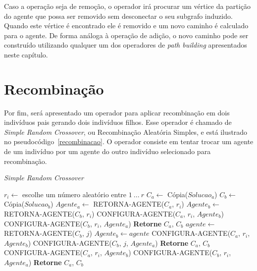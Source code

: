 Caso a operação seja de remoção, o operador irá procurar um vértice da partição 
do agente que possa ser removido sem desconectar o seu subgrafo induzido. Quando 
este vértice é encontrado ele é removido e um novo caminho é calculado para 
o agente. De forma análoga à operação de adição, o novo caminho pode ser 
construído utilizando qualquer um dos operadores de \textit{path building} 
apresentados neste capítulo.

\section{Recombinação}

Por fim, será apresentado um operador para aplicar recombinação em dois 
indivíduos pais gerando dois indivíduos filhos. Esse operador é chamado de 
\textit{Simple Random Crossover}, ou Recombinação Aleatória Simples, e está 
ilustrado no pseudocódigo~\ref{recombinacao}. O operador consiste em tentar 
trocar um agente de um indivíduo por um agente do outro indivíduo selecionado 
para recombinação.

\begin{algorithm}                   %
	\caption{\textit{Simple Random Crossover}}          %
	\label{recombinacao}                           %
	\begin{algorithmic}[1]                   %
		\newline
		\State $r_{i} \gets $ escolhe um número aleatório entre $1\ ...\ r$
		\State $C_{a} \gets $ Cópia($Solucao_{a}$) 
		\State $C_{b} \gets $ Cópia($Solucao_{b}$) 
		\State $Agente_{a} \gets $ RETORNA-AGENTE($C_{a}$, $r_{i}$)
		\State $Agente_{b} \gets $ RETORNA-AGENTE($C_{b}$, $r_{i}$)
			\State CONFIGURA-AGENTE($C_{a}$, $r_{i}$, $Agente_{b}$)
			\State CONFIGURA-AGENTE($C_{b}$, $r_{i}$, $Agente_{a}$)
			\State \textbf{Retorne} $C_{a}$, $C_{b}$
		\Else
				\State $agente \gets $ RETORNA-AGENTE($C_{b}$, $j$)
					\State $Agente_{b} \gets agente$
					\State CONFIGURA-AGENTE($C_{a}$, $r_{i}$, $Agente_{b}$)
					\State CONFIGURA-AGENTE($C_{b}$, $j$, $Agente_{a}$)
					\State \textbf{Retorne} $C_{a}$, $C_{b}$
				\EndIf
			\EndFor
			\State CONFIGURA-AGENTE($C_{a}$, $r_{i}$, $Agente_{b}$)
			\State CONFIGURA-AGENTE($C_{b}$, $r_{i}$, $Agente_{a}$)
			\State \textbf{Retorne} $C_{a}$, $C_{b}$
		\EndIf
		\EndProcedure
	\end{algorithmic}
\end{algorithm}

